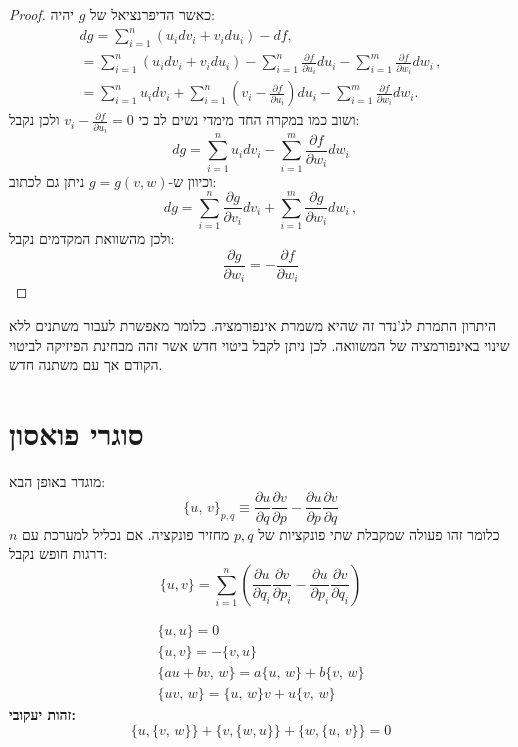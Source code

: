 \documentclass{tstextbook}
\begin{document}
\begin{proof}
כאשר הדיפרנציאל של \(g\) יהיה:
$$\begin{array}{l}{{d g=\displaystyle\sum_{i=1}^{n}\left(u_{i}d v_{i}+v_{i}d u_{i}\right)-d f,}}\\ {{=\displaystyle\sum_{i=1}^{n}\left(u_{i}d v_{i}+v_{i}d u_{i}\right)-\sum_{i=1}^{n}\frac{\partial f}{\partial u_{i}}d u_{i}-\sum_{i=1}^{m}\frac{\partial f}{\partial w_{i}}d w_{i}\,,}}\\ {{=\displaystyle\sum_{i=1}^{n}u_{i}d v_{i}+\sum_{i=1}^{n}\left(v_{i}-\frac{\partial f}{\partial u_{i}}\right)d u_{i}-\sum_{i=1}^{m}\frac{\partial f}{\partial w_{i}}d w_{i}.}}\end{array}$$
ושוב כמו במקרה החד מימדי נשים לב כי \(v_{i}-\frac{\partial f}{\partial u_{i}}=0\) ולכן נקבל:
$$d g=\sum_{i=1}^{n}u_{i}d v_{i}-\sum_{i=1}^{m}\frac{\partial f}{\partial w_{i}}d w_{i}$$
וכיוון ש-\(g=g(v,w)\) ניתן גם לכתוב:
$$d g=\sum_{i=1}^{n}\frac{\partial g}{\partial v_{i}}d v_{i}+\sum_{i=1}^{m}\frac{\partial g}{\partial w_{i}}d w_{i}\,,$$
ולכן מהשוואת המקדמים נקבל:
$${\frac{\partial g}{\partial w_{i}}}=-{\frac{\partial f}{\partial w_{i}}}$$

\end{proof}
\begin{remark}
היתרון התמרת לג'נדר זה שהיא משמרת אינפורמציה. כלומר מאפשרת לעבור משתנים ללא שינוי באינפורמציה של המשוואה. לכן ניתן לקבל ביטוי חדש אשר זהה מבחינת הפיזיקה לביטוי הקודם אך עם משתנה חדש.

\end{remark}
\section{סוגרי פואסון}

\begin{definition}
מוגדר באופן הבא:
$$\{u,\,v\}_{p,q}\equiv{\frac{\partial u}{\partial q}}{\frac{\partial v}{\partial p}}-{\frac{\partial u}{\partial p}}{\frac{\partial v}{\partial q}}$$
כלומר זהו פעולה שמקבלת שתי פונקציות של \(p,q\) מחזיר פונקציה. אם נכליל למערכת עם \(n\) דרגות חופש נקבל:
$$\{u,v\}=\sum_{i=1}^{n}\left({\frac{\partial u}{\partial q_{i}}}{\frac{\partial v}{\partial p_{i}}}-{\frac{\partial u}{\partial p_{i}}}{\frac{\partial v}{\partial q_{i}}}\right)$$

\end{definition}
\begin{proposition}
$$\begin{array}{c}{{{\{u,u\}=0}}}\\ {{{\{u,v\}=-\{v,u\}}}}\\ {{{\{a u+b v,\,w\}=a\{u,\,w\}+b\{v,\,w\}}}}\\  {{{\{u v,\,w\}=\{u,\,w\}v+u\{v,\,w\}}}}\end{array}$$\textbf{זהות יעקובי:}$$\{u,\{v,\,w\}\}+\{v,\{w,u\}\}+\{w,\{u,\,v\}\}=0$$

\end{proposition}
\end{document}
